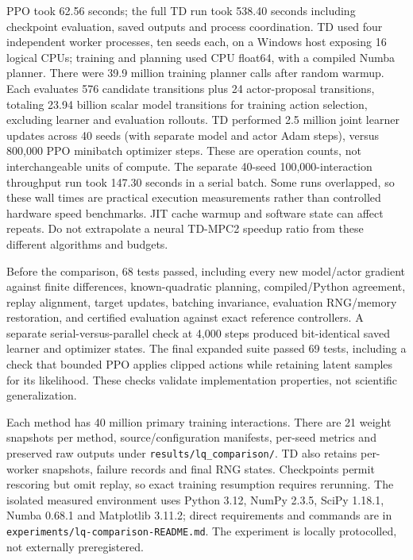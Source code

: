 \documentclass[11pt]{article}
\begin{document}
PPO took 62.56 seconds; the full TD run took 538.40 seconds including checkpoint evaluation, saved outputs and process coordination. TD used four independent worker processes, ten seeds each, on a Windows host exposing 16 logical CPUs; training and planning used CPU float64, with a compiled Numba planner. There were 39.9 million training planner calls after random warmup. Each evaluates 576 candidate transitions plus 24 actor-proposal transitions, totaling 23.94 billion scalar model transitions for training action selection, excluding learner and evaluation rollouts. TD performed 2.5 million joint learner updates across 40 seeds (with separate model and actor Adam steps), versus 800,000 PPO minibatch optimizer steps. These are operation counts, not interchangeable units of compute. The separate 40-seed 100,000-interaction throughput run took 147.30 seconds in a serial batch. Some runs overlapped, so these wall times are practical execution measurements rather than controlled hardware speed benchmarks. JIT cache warmup and software state can affect repeats. Do not extrapolate a neural TD-MPC2 speedup ratio from these different algorithms and budgets.

Before the comparison, 68 tests passed, including every new model/actor gradient against finite differences, known-quadratic planning, compiled/Python agreement, replay alignment, target updates, batching invariance, evaluation RNG/memory restoration, and certified evaluation against exact reference controllers. A separate serial-versus-parallel check at 4,000 steps produced bit-identical saved learner and optimizer states. The final expanded suite passed 69 tests, including a check that bounded PPO applies clipped actions while retaining latent samples for its likelihood. These checks validate implementation properties, not scientific generalization.

Each method has 40 million primary training interactions. There are 21 weight snapshots per method, source/configuration manifests, per-seed metrics and preserved raw outputs under \texttt{results/lq\_comparison/}. TD also retains per-worker snapshots, failure records and final RNG states. Checkpoints permit rescoring but omit replay, so exact training resumption requires rerunning. The isolated measured environment uses Python 3.12, NumPy 2.3.5, SciPy 1.18.1, Numba 0.68.1 and Matplotlib 3.11.2; direct requirements and commands are in \texttt{experiments/lq-comparison-README.md}. The experiment is locally protocolled, not externally preregistered.
\end{document}
